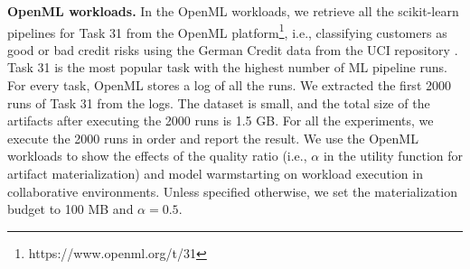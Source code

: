 \textbf{OpenML workloads.} In the OpenML workloads, we retrieve all the scikit-learn pipelines for Task 31 from the OpenML platform\footnote{https://www.openml.org/t/31}, i.e., classifying customers as good or bad credit risks using the German Credit data from the UCI repository \cite{asuncion2007uci}.
Task 31 is the most popular task with the highest number of ML pipeline runs.
For every task, OpenML stores a log of all the runs.
We extracted the first 2000 runs of Task 31 from the logs.
The dataset is small, and the total size of the artifacts after executing the 2000 runs is 1.5 GB.
For all the experiments, we execute the 2000 runs in order and report the result.
We use the OpenML workloads to show the effects of the quality ratio (i.e., $\alpha$ in the utility function for artifact materialization) and model warmstarting on workload execution in collaborative environments.
Unless specified otherwise, we set the materialization budget to 100 MB and $\alpha=0.5$.
